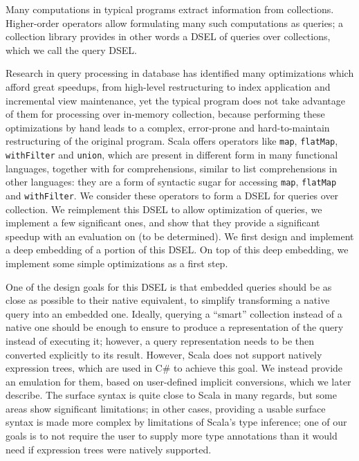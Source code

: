\documentclass[preprint,authoryear,10pt]{sigplanconf}
\begin{document}
Many computations in typical programs extract information from
collections. Higher-order operators allow formulating many such
computations as queries; a collection library provides in other words a
DSEL of queries over collections, which we call the query DSEL.

Research in query processing in database has identified many
optimizations which afford great speedups, from high-level restructuring
to index application and incremental view maintenance, yet the typical
program does not take advantage of them for processing over in-memory
collection, because performing these optimizations by hand leads to a
complex, error-prone and hard-to-maintain restructuring of the original
program. Scala offers operators like \texttt{map}, \texttt{flatMap},
\texttt{withFilter} and \texttt{union}, which are present in different
form in many functional languages, together with for comprehensions,
similar to list comprehensions in other languages: they are a form of
syntactic sugar for accessing \texttt{map}, \texttt{flatMap} and
\texttt{withFilter}. We consider these operators to form a DSEL for
queries over collection. We reimplement this DSEL to allow optimization
of queries, we implement a few significant ones, and show that they
provide a significant speedup with an evaluation on (to be determined).
We first design and implement a deep embedding of a portion of this
DSEL. On top of this deep embedding, we implement some simple
optimizations as a first step.

One of the design goals for this DSEL is that embedded queries should be
as close as possible to their native equivalent, to simplify
transforming a native query into an embedded one. Ideally, querying a
``smart'' collection instead of a native one should be enough to ensure
to produce a representation of the query instead of executing it;
however, a query representation needs to be then converted explicitly to
its result. However, Scala does not support natively expression trees,
which are used in C\# to achieve this goal. We instead provide an
emulation for them, based on user-defined implicit conversions, which we
later describe. The surface syntax is quite close to Scala in many
regards, but some areas show significant limitations; in other cases,
providing a usable surface syntax is made more complex by limitations of
Scala's type inference; one of our goals is to not require the user to
supply more type annotations than it would need if expression trees were
natively supported.

\end{document}
